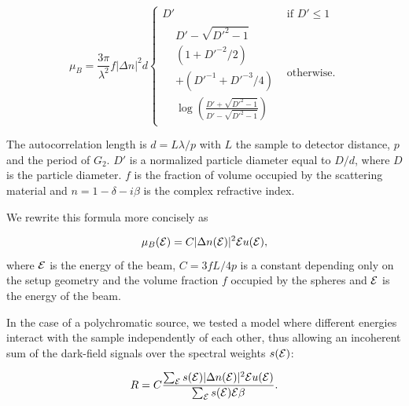 \begin{equation}
\mu_B = \frac{3\pi}{\lambda^2}f |\Delta n|^2 d
    \begin{cases}
    D' & \text{if } D' \leq 1\\
    \begin{aligned}
    & D' - \sqrt{D'^2 - 1}\\
    & (1 + D'^{-2}/2) \\
    & + (D'^{-1} + D'^{-3} / 4) \\
    & \log\left(\frac{D' + \sqrt{D'^2 - 1}}{D' - \sqrt{D'^2 - 1}}\right)
    \end{aligned} & \text{otherwise.}
    \end{cases}\label{eqn:lynch}
\end{equation}

The autocorrelation length is $d = L\lambda / p$ with $L$ the sample to
detector distance, $p$ and the period of $G_2$. $D'$ is a normalized
particle diameter equal to $D/d$, where $D$ is the particle diameter. $f$ is
the fraction of volume occupied by the scattering material and $n = 1 -
\delta - i\beta$ is the complex refractive index.

We rewrite this formula more concisely as

\begin{equation}
    \mu_B(\mathcal{E}) = C |\Delta n(\mathcal{E})|^2 \mathcal{E} u(\mathcal{E}),
    \label{eqn:lynchshort}
\end{equation}
where $\mathcal{E}$ is the energy of the beam, $C = 3 fL / 4p$ is a constant
depending only on the setup geometry and the volume fraction $f$ occupied by
the spheres and $\mathcal{E}$ is the energy of the beam.

In the case of a polychromatic source, we tested a model where different
energies interact with the sample independently of each other, thus allowing
an incoherent sum of the dark-field signals over the spectral weights
$s(\mathcal{E})$:

\begin{equation}
    R = C \frac{\sum_{\mathcal{E}} s(\mathcal{E})|\Delta n(\mathcal{E})|^2 \mathcal{E} u(\mathcal{E})}{\sum_{\mathcal{E}} s(\mathcal{E}) \mathcal{E} \beta}.
    \label{eqn:lynchpolychromatic}
\end{equation}

